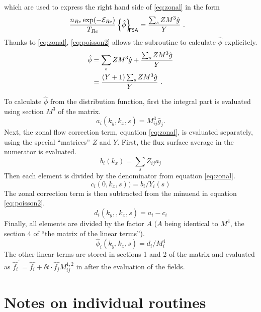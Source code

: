 which are used to express the right hand side of \ref{eq:zonal} in the form
\begin{align}
{n_{Re}\exp(-\mathcal{E}_{R{\rm e}}) \over T_{Re} } \left\{ \hat\phi\right\}_{\!\!\text{\textsf{FSA}}}
  &= {\sum_s Z M^3 {\hat g} \over Y}\ .
\label{eq:zonalmatrixform}
\end{align}
\ifmoredetails
Thanks to \ref{eq:zonal}, \ref{eq:poisson2} allows the subroutine
 to calculate $\hat\phi$ explicitely.
\begin{align}
\hat{\phi } & = \sum_s Z M^3 {\hat g} + {\sum_s Z M^3 {\hat g} \over Y} \\
            & = {(Y + 1)\sum_s Z M^3 {\hat g} \over Y}\ .
\end{align}
\fi


To calculate $\hat\phi$ from the distribution function, first the integral
part  is evaluated using section $M^3$ of the
matrix.
\begin{equation}
a_i(k_y,k_x,s) = M^{3}_{ij} {\hat g}_j.
\end{equation}
Next, the zonal flow correction term, equation \ref{eq:zonal}, is evaluated
separately, using the special ``matrices'' $Z$ and $Y$.  First, the flux surface
average in the numerator is evaluated.
\begin{equation}
b_i(k_x) = \sum_s Z_{ij} a_j 
\end{equation}
Then each element is divided by the denominator from equation \ref{eq:zonal}.
\begin{equation}
c_i(0,k_x,s)) = b_i / Y_i(s) 
\end{equation}
The zonal correction term is then subtracted from the minuend in
equation \ref{eq:poisson2}.
\begin{equation}
d_i(k_y,,k_x,s)=a_i-c_i 
\end{equation}
Finally, all elements are divided by the factor $A$ ($A$ being identical
to $M^4$, the section 4 of ``the matrix of the linear terms'').
\begin{equation}
{\hat \phi}_i(k_y,k_x,s) = d_i / M^4_i
\end{equation}
The other linear terms are stored in sections 1 and 2 of the matrix and evaluated as 
$\hat{f_i}^\prime = \hat{f_i} + \delta t \cdot \hat{f_j} M^{1,2}_{ij}$ in 
after the evaluation of the fields.

\section{Notes on individual routines} 

